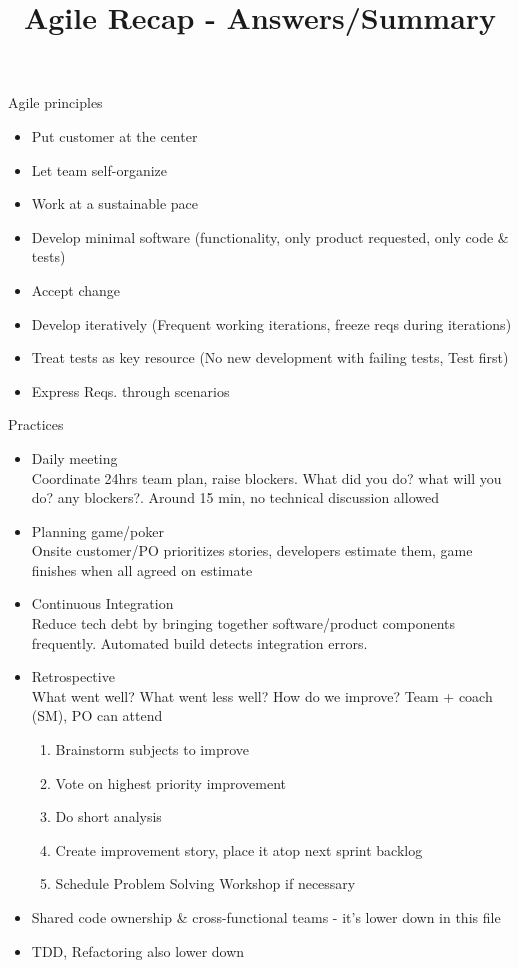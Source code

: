 \documentclass[10pt]{article}
\title{Agile Recap - Answers/Summary}
\date{}
\author{}
\begin{document}
\maketitle
Agile principles
\begin{itemize}
\item Put customer at the center
\item Let team self-organize
\item Work at a sustainable pace
\item Develop minimal software (functionality, only product requested, only code \& tests)
\item Accept change
\end{itemize}
\begin{itemize}
\item Develop iteratively (Frequent working iterations, freeze reqs during iterations)
\item Treat tests as key resource (No new development with failing tests, Test first)
\item Express Reqs. through scenarios
\end{itemize}
Practices
\begin{itemize}
\item Daily meeting\\
Coordinate 24hrs team plan, raise blockers. What did you do? what will you do? any blockers?. Around 15 min, no technical discussion allowed
\item Planning game/poker\\
Onsite customer/PO prioritizes stories, developers estimate them, game finishes when all agreed on estimate
\item Continuous Integration\\
Reduce tech debt by bringing together software/product components frequently. Automated build detects integration errors.
\item Retrospective\\
What went well? What went less well? How do we improve? Team + coach (SM), PO can attend
\begin{enumerate}
\item Brainstorm subjects to improve
\item Vote on highest priority improvement
\item Do short analysis
\item Create improvement story, place it atop next sprint backlog
\item Schedule Problem Solving Workshop if necessary
\end{enumerate}
\item Shared code ownership \& cross-functional teams - it's lower down in this file
\item TDD, Refactoring also lower down
\end{itemize}
\end{document}
